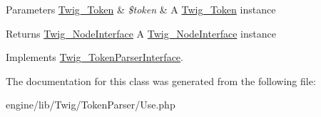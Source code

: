 \begin{DoxyParams}[1]{Parameters}
\hyperlink{class_twig___token}{Twig\+\_\+\+Token} & {\em \$token} & A \hyperlink{class_twig___token}{Twig\+\_\+\+Token} instance\\
\hline
\end{DoxyParams}
\begin{DoxyReturn}{Returns}
\hyperlink{interface_twig___node_interface}{Twig\+\_\+\+Node\+Interface} A \hyperlink{interface_twig___node_interface}{Twig\+\_\+\+Node\+Interface} instance 
\end{DoxyReturn}


Implements \hyperlink{interface_twig___token_parser_interface_a5dfa2e269321584fb74e8b43dabe0efd}{Twig\+\_\+\+Token\+Parser\+Interface}.



The documentation for this class was generated from the following file\+:\begin{DoxyCompactItemize}
\item 
engine/lib/\+Twig/\+Token\+Parser/Use.\+php\end{DoxyCompactItemize}
